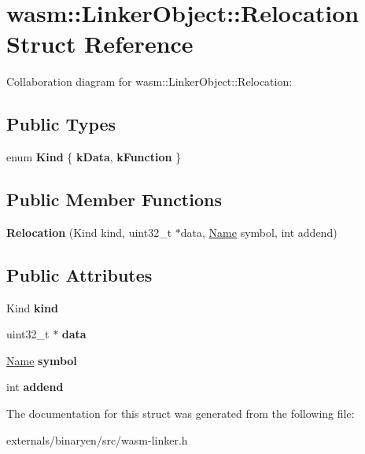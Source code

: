 \hypertarget{structwasm_1_1_linker_object_1_1_relocation}{}\section{wasm\+:\+:Linker\+Object\+:\+:Relocation Struct Reference}
\label{structwasm_1_1_linker_object_1_1_relocation}


Collaboration diagram for wasm\+:\+:Linker\+Object\+:\+:Relocation\+:
\subsection*{Public Types}
\begin{DoxyCompactItemize}
\item 
\mbox{\label{structwasm_1_1_linker_object_1_1_relocation_a849a588c744edf7deb043546673763fa}} 
enum {\bfseries Kind} \{ {\bfseries k\+Data}, 
{\bfseries k\+Function}
 \}
\end{DoxyCompactItemize}
\subsection*{Public Member Functions}
\begin{DoxyCompactItemize}
\item 
\mbox{\label{structwasm_1_1_linker_object_1_1_relocation_ac199bad49099308d8fedd79ff24a9cae}} 
{\bfseries Relocation} (Kind kind, uint32\+\_\+t $\ast$data, \mbox{\hyperlink{structwasm_1_1_name}{Name}} symbol, int addend)
\end{DoxyCompactItemize}
\subsection*{Public Attributes}
\begin{DoxyCompactItemize}
\item 
\mbox{\label{structwasm_1_1_linker_object_1_1_relocation_a4e1d644c9f14274b3cefe96b4615e761}} 
Kind {\bfseries kind}
\item 
\mbox{\label{structwasm_1_1_linker_object_1_1_relocation_acd28bf20463ff72defbaa30c98129458}} 
uint32\+\_\+t $\ast$ {\bfseries data}
\item 
\mbox{\label{structwasm_1_1_linker_object_1_1_relocation_a158c134228e7f2406007238d2dc24e04}} 
\mbox{\hyperlink{structwasm_1_1_name}{Name}} {\bfseries symbol}
\item 
\mbox{\label{structwasm_1_1_linker_object_1_1_relocation_ade1425cefae6fb9138115fca024d918d}} 
int {\bfseries addend}
\end{DoxyCompactItemize}


The documentation for this struct was generated from the following file\+:\begin{DoxyCompactItemize}
\item 
externals/binaryen/src/wasm-\/linker.\+h\end{DoxyCompactItemize}
